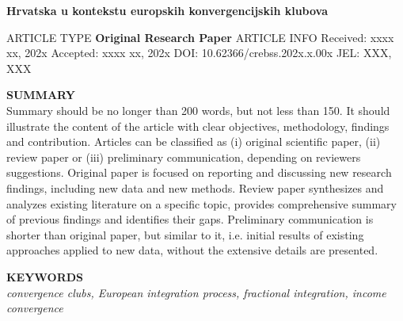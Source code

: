 \documentclass{crebsshr}
\begin{document}
    
    \bigskip
    \bigskip
    

\begin{center}
    \large  \bf Hrvatska u kontekstu europskih konvergencijskih klubova
\end{center}

\begin{minipage}[b]{\dimexpr0.32\textwidth-1\fboxrule-0.5\fboxsep\relax}
    ARTICLE TYPE \newline
    \rm\small \textbf{Original Research Paper} \newline \newline \newline
    ARTICLE INFO \newline
    Received: xxxx xx, 202x \newline Accepted: xxxx xx, 202x \newline DOI: 10.62366/crebss.202x.x.00x \newline JEL: XXX, XXX  \newline \newline \newline
\end{minipage}%
\begin{minipage}[b]{0.68\textwidth}
    \vspace{0.2cm}  \textbf{SUMMARY} \\
    Summary should be no longer than 200 words, but not less than 150. It should illustrate the content of the article with clear objectives, methodology, findings and contribution. Articles can be classified as (i) original scientific paper, (ii) review paper or (iii) preliminary communication, depending on reviewers suggestions. Original paper is focused on reporting and discussing new research findings, including new data and new methods. Review paper synthesizes and analyzes existing literature on a specific topic, provides comprehensive summary of previous findings and identifies their gaps. Preliminary communication is shorter than original paper, but similar to it, i.e. initial results of existing approaches applied to new data, without the extensive details are presented.
    
    \textbf{KEYWORDS} \\ 
    \textit{convergence clubs, European integration process, fractional integration, income convergence}
    
\end{minipage} 
\end{document}
